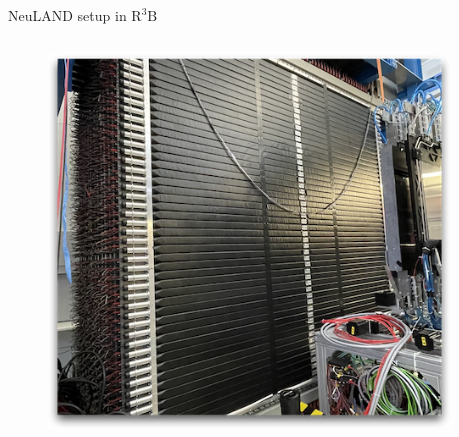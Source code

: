\documentclass[compress, 13pt, aspectratio=169]{beamer}
\begin{document}
{
    \begin{frame}{NeuLAND setup in $\text{R}^3\text{B}$}
        \begin{columns}[c]
            \begin{column}{0.4\textwidth}
                \pause
                \begin{figure}
                    \includegraphics[width = \textwidth]{neulandReal}
                \end{figure}
            \end{column}
            \hspace*{0.5cm}
            \begin{column}{0.3\textwidth}

\end{column}
\end{columns}
\end{frame}}
\end{document}
